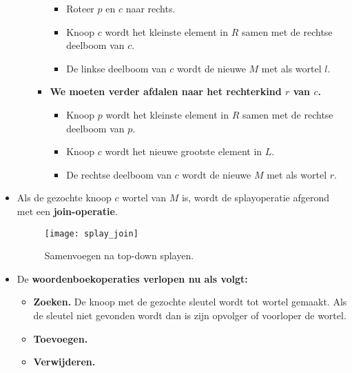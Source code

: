 \begin{itemize}
\begin{enumerate}
\begin{itemize}
\begin{itemize}
                \item Roteer $p$ en $c$ naar rechts.
                \item Knoop $c$ wordt het kleinste element in $R$ samen met de rechtse deelboom van $c$.
                \item De linkse deelboom van $c$ wordt de nieuwe $M$ met als wortel $l$.
            \end{itemize}
            \item \textbf{We moeten verder afdalen naar het rechterkind $r$ van $c$.}
            \begin{itemize}
                \item Knoop $p$ wordt het kleinste element in $R$ samen met de rechtse deelboom van $p$.
                \item Knoop $c$ wordt het nieuwe grootste element in $L$.
                \item De rechtse deelboom van $c$ wordt de nieuwe $M$ met als wortel $r$.
            \end{itemize}
        \end{itemize}
    \end{enumerate}
    \item Als de gezochte knoop $c$ wortel van $M$ is, wordt de splayoperatie afgerond met een \textbf{join-operatie}.
    \begin{figure}[ht]
        \centering
        \texttt{[image: splay\_join]}
        \caption{Samenvoegen na top-down splayen.}
        \label{fig:splay_join}
    \end{figure}
    \item De \textbf{woordenboekoperaties verlopen nu als volgt:}
    \begin{itemize}
        \item \textbf{Zoeken.} De knoop met de gezochte sleutel wordt tot wortel gemaakt. Als de sleutel niet gevonden wordt dan is zijn opvolger of voorloper de wortel.
        \item \textbf{Toevoegen.} 
        \item \textbf{Verwijderen.}
    \end{itemize}
\end{itemize}


